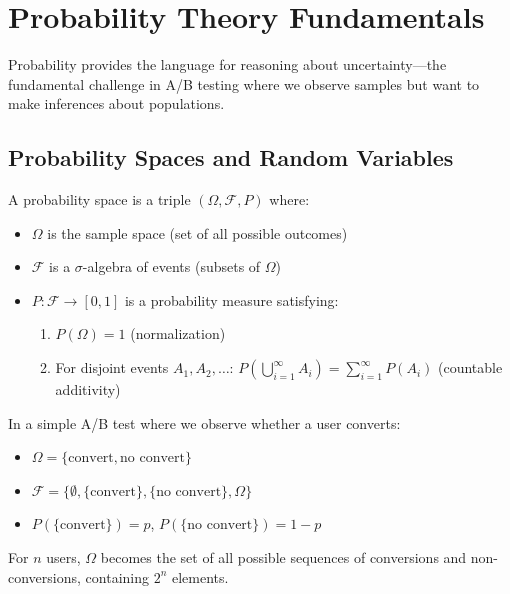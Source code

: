 \section{Probability Theory Fundamentals}

Probability provides the language for reasoning about uncertainty—the fundamental challenge in A/B testing where we observe samples but want to make inferences about populations.

\subsection{Probability Spaces and Random Variables}

\begin{definition}
A probability space is a triple $(\Omega, \mathcal{F}, P)$ where:
\begin{itemize}
    \item $\Omega$ is the sample space (set of all possible outcomes)
    \item $\mathcal{F}$ is a $\sigma$-algebra of events (subsets of $\Omega$)
    \item $P: \mathcal{F} \rightarrow [0,1]$ is a probability measure satisfying:
    \begin{enumerate}
        \item $P(\Omega) = 1$ (normalization)
        \item For disjoint events $A_1, A_2, \ldots$: $P(\bigcup_{i=1}^{\infty} A_i) = \sum_{i=1}^{\infty} P(A_i)$ (countable additivity)
    \end{enumerate}
\end{itemize}
\end{definition}

\begin{example}
In a simple A/B test where we observe whether a user converts:
\begin{itemize}
    \item $\Omega = \{\text{convert}, \text{no convert}\}$
    \item $\mathcal{F} = \{\emptyset, \{\text{convert}\}, \{\text{no convert}\}, \Omega\}$
    \item $P(\{\text{convert}\}) = p$, $P(\{\text{no convert}\}) = 1-p$
\end{itemize}

For $n$ users, $\Omega$ becomes the set of all possible sequences of conversions and non-conversions, containing $2^n$ elements.
\end{example}

